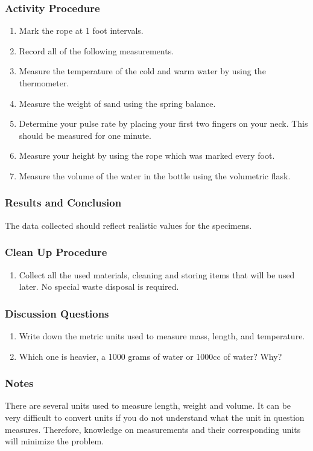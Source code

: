 \subsubsection*{Activity Procedure}
\begin{enumerate}
\item{Mark the rope at 1 foot intervals.}
\item{Record all of the following measurements.}
\item{Measure the temperature of the cold and warm water by using the thermometer.}
\item{Measure the weight of sand using the spring balance.}
\item{Determine your pulse rate by placing your first two fingers on your neck. This should be measured for one minute.}
\item{Measure your height by using the rope which was marked every foot.}
\item{Measure the volume of the water in the bottle using the volumetric flask.}
\end{enumerate}

\subsubsection*{Results and Conclusion}
The data collected should reflect realistic values for the specimens. 

\subsubsection*{Clean Up Procedure}
\begin{enumerate}
\item{Collect all the used materials, cleaning and storing items that will be used later. No special waste disposal is required.}
\end{enumerate}

\subsubsection*{Discussion Questions}
\begin{enumerate}
\item{Write down the metric units used to measure mass, length, and temperature.}
\item{Which one is heavier, a 1000 grams of water or 1000cc of water? Why?}
\end{enumerate}

\subsubsection*{Notes}
There are several units used to measure length, weight and volume. It can be very difficult to convert units if you do not understand what the unit in question measures. Therefore, knowledge on measurements and their corresponding units will minimize the problem.
